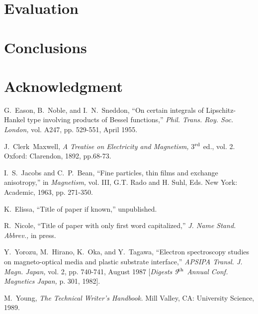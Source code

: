 \documentclass[conference,a4paper]{APSIPA2018}
\begin{document}
\section{Evaluation}


\section{Conclusions}


\section*{Acknowledgment}





G.~Eason, B.~Noble, and I.~N.~Sneddon, ``On certain integrals of
Lipschitz-Hankel type involving products of Bessel functions,''
\emph{Phil. Trans. Roy. Soc. London,} vol. A247, pp. 529-551, April
1955.

J.~Clerk~Maxwell, \emph{A Treatise on Electricity and Magnetism,}
3$^{\rm rd}$ ed., vol. 2. Oxford: Clarendon, 1892, pp.68-73.

I.~S.~Jacobs and C.~P.~Bean, ``Fine particles, thin films and exchange
anisotropy,'' in \emph{Magnetism,} vol. III, G.T. Rado and H. Suhl,
Eds. New York: Academic, 1963, pp. 271-350.

K.~Elissa, ``Title of paper if known,'' unpublished.

R.~Nicole, ``Title of paper with only first word capitalized,''
\emph{J. Name Stand. Abbrev.,} in press.

Y.~Yorozu, M.~Hirano, K.~Oka, and Y.~Tagawa, ``Electron spectroscopy
studies on magneto-optical media and plastic substrate interface,''
\emph{APSIPA Transl. J. Magn. Japan,} vol. 2, pp. 740-741, August 1987
[\emph{Digests 9$^{\rm th}$ Annual Conf. Magnetics Japan,} p. 301,
1982].

M.~Young, \emph{The Technical Writer's Handbook.} Mill Valley, CA:
University Science, 1989.
\fi
\end{document}
